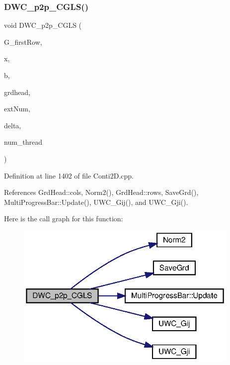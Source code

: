 \subsubsection{D\+W\+C\+\_\+p2p\+\_\+\+C\+G\+L\+S()}
{\footnotesize\ttfamily void D\+W\+C\+\_\+p2p\+\_\+\+C\+G\+LS (\begin{DoxyParamCaption}\item[{double $\ast$}]{G\+\_\+first\+Row,  }\item[{double $\ast$}]{x,  }\item[{double $\ast$}]{b,  }\item[{\textbf{ Grd\+Head}}]{grdhead,  }\item[{int}]{ext\+Num,  }\item[{double}]{delta,  }\item[{int}]{num\+\_\+thread }\end{DoxyParamCaption})}



Definition at line 1402 of file Conti2\+D.\+cpp.



References Grd\+Head\+::cols, Norm2(), Grd\+Head\+::rows, Save\+Grd(), Multi\+Progress\+Bar\+::\+Update(), U\+W\+C\+\_\+\+Gij(), and U\+W\+C\+\_\+\+Gji().

Here is the call graph for this function\+:
\nopagebreak
\begin{figure}[H]
\begin{center}
\leavevmode
\includegraphics[width=305pt]{Conti2D_8cpp_a68e9e4a8817a29dce16c782fa8213faa_a68e9e4a8817a29dce16c782fa8213faa_cgraph}
\end{center}
\end{figure}
\mbox{\label{Conti2D_8cpp_afb187c363388d28caa8a055176269f12_afb187c363388d28caa8a055176269f12}} 
